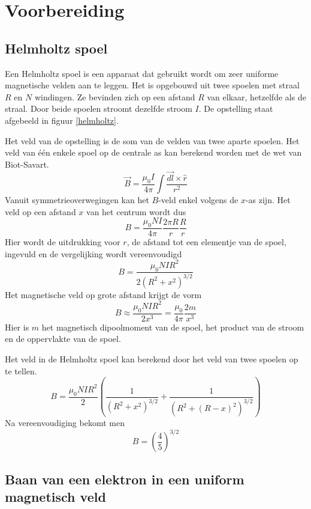 \section{Voorbereiding}
\subsection{Helmholtz spoel}

Een Helmholtz spoel is een apparaat dat gebruikt wordt om zeer uniforme 
magnetische velden aan te leggen. Het is opgebouwd uit twee spoelen met straal 
$R$ en $N$ windingen. Ze bevinden zich op een afstand $R$ van elkaar,
hetzelfde als de straal. Door beide spoelen stroomt dezelfde stroom $I$. De 
opstelling staat afgebeeld in figuur \ref{helmholtz}.


Het veld van de opstelling is de som van de velden van twee aparte spoelen. Het 
veld van \'e\'en enkele spoel op de centrale as kan berekend worden met de wet 
van Biot-Savart.
$$
\vec{B} = \frac{\mu_0 I}{4 \pi} \int \frac{\vec{dl} \times \hat{r}}{r^2}
$$
Vanuit symmetrieoverwegingen kan het $B$-veld enkel volgens de $x$-as zijn. Het 
veld op een afstand $x$ van het centrum wordt dus
$$
B = \frac{\mu_0 NI}{4 \pi} \frac{2 \pi R}{r} \frac{R}{r}
$$
Hier wordt de uitdrukking voor $r$, de afstand tot een elementje van de spoel, 
ingevuld en de vergelijking wordt vereenvoudigd
$$
B = \frac{\mu_0 NI R^2}{2(R^2+x^2)^{3/2}}
$$
Het magnetische veld op grote afstand krijgt de vorm
$$
B \approx \frac{\mu_0 NI R^2}{2x^3} = \frac{\mu_0}{4 \pi}\frac{2m}{x^3}
$$
Hier is $m$ het magnetisch dipoolmoment van de spoel, het product van de stroom 
en de oppervlakte van de spoel.

Het veld in de Helmholtz spoel kan berekend door het veld van twee spoelen op 
te tellen.
$$
B = \frac{\mu_0 NI R^2}{2}\left( \frac{1}{(R^2+x^2)^{3/2}} + 
\frac{1}{(R^2+(R-x)^2)^{3/2}} \right)
$$
Na vereenvoudiging bekomt men
$$
B = \left(\frac{4}{5}\right)^{3/2} 
$$

\subsection{Baan van een elektron in een uniform magnetisch veld}

